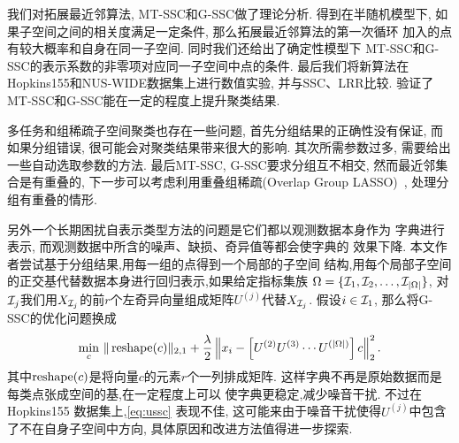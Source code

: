 我们对拓展最近邻算法, MT-SSC和G-SSC做了理论分析. 得到在半随机模型下,
如果子空间之间的相关度满足一定条件, 那么拓展最近邻算法的第一次循环
加入的点有较大概率和自身在同一子空间. 同时我们还给出了确定性模型下
MT-SSC和G-SSC的表示系数的非零项对应同一子空间中点的条件.
最后我们将新算法在Hopkins155和NUS-WIDE数据集上进行数值实验,
并与SSC、LRR比较. 验证了MT-SSC和G-SSC能在一定的程度上提升聚类结果.

多任务和组稀疏子空间聚类也存在一些问题, 首先分组结果的正确性没有保证,
而如果分组错误, 很可能会对聚类结果带来很大的影响.
其次所需参数过多, 需要给出一些自动选取参数的方法.
最后MT-SSC, G-SSC要求分组互不相交, 然而最近邻集合是有重叠的,
下一步可以考虑利用重叠组稀疏(Overlap Group LASSO)~\cite{jacob2009group},
处理分组有重叠的情形.

另外一个长期困扰自表示类型方法的问题是它们都以观测数据本身作为
字典进行表示, 而观测数据中所含的噪声、缺损、奇异值等都会使字典的
效果下降. 本文作者尝试基于分组结果,用每一组的点得到一个局部的子空间
结构,用每个局部子空间的正交基代替数据本身进行回归表示,如果给定指标集族
\(\Omega=\{\mathcal{I}_1, \mathcal{I}_2, \ldots, \mathcal{I}_{|\Omega|}\}\),
对\(\mathcal{I}_j\)我们用\(X_{\mathcal{I}_j}\)的前\(r\)个左奇异向量组成矩阵\(U^{(j)}\)代替\(X_{\mathcal{I}_j}\).
假设\(i \in \mathcal{I}_1\), 那么将G-SSC的优化问题换成
\begin{equation}
  \min_{c} \, \|\operatorname{reshape}(c)\|_{2, 1}+\frac{\lambda}{2}
  \left\|x_i-\left[ U^{(2)} U^{(3)} \cdots U^{(|\Omega|)}\right]c\right\|_2^2.
  \label{eq:ussc}
\end{equation}
其中\(\operatorname{reshape}(c)\)是将向量\(c\)的元素\(r\)个一列排成矩阵.
这样字典不再是原始数据而是每类点张成空间的基,在一定程度上可以
使字典更稳定,减少噪音干扰. 不过在Hopkins155 数据集上,\eqref{eq:ussc} 表现不佳,
这可能来由于噪音干扰使得\(U^{(j)}\)中包含了不在自身子空间中方向,
具体原因和改进方法值得进一步探索.
